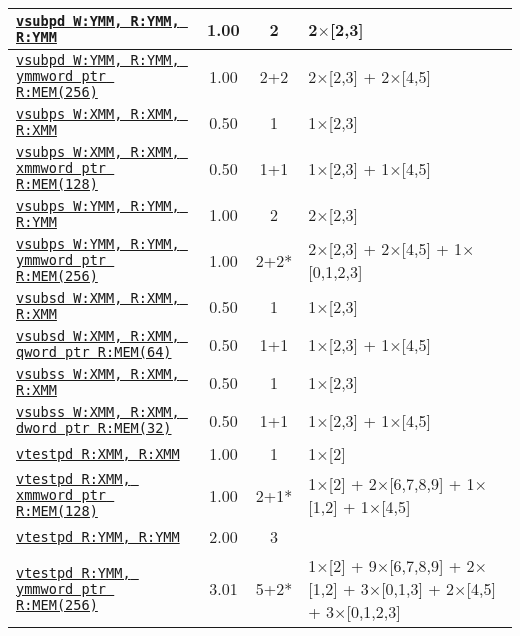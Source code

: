 \documentclass[a4paper,english,fontsize=9]{scrartcl}
\begin{document}
\begin{longtable}{p{}ccL{.25\textwidth}}
  \midrule
  \texttt{\href{https://felixcloutier.com/x86/SUBPD.html}{vsubpd W:YMM, R:YMM, R:YMM}} & 1.00 & 2 & 2\(\times\)[2,3] \\
  \midrule
  \texttt{\href{https://felixcloutier.com/x86/SUBPD.html}{vsubpd W:YMM, R:YMM, ymmword ptr R:MEM(256)}} & 1.00 & 2+2 & 2\(\times\)[2,3] + 2\(\times\)[4,5] \\
  \midrule
  \texttt{\href{https://felixcloutier.com/x86/SUBPS.html}{vsubps W:XMM, R:XMM, R:XMM}} & 0.50 & 1 & 1\(\times\)[2,3] \\
  \midrule
  \texttt{\href{https://felixcloutier.com/x86/SUBPS.html}{vsubps W:XMM, R:XMM, xmmword ptr R:MEM(128)}} & 0.50 & 1+1 & 1\(\times\)[2,3] + 1\(\times\)[4,5] \\
  \midrule
  \texttt{\href{https://felixcloutier.com/x86/SUBPS.html}{vsubps W:YMM, R:YMM, R:YMM}} & 1.00 & 2 & 2\(\times\)[2,3] \\
  \midrule
  \texttt{\href{https://felixcloutier.com/x86/SUBPS.html}{vsubps W:YMM, R:YMM, ymmword ptr R:MEM(256)}} & 1.00 & 2+2* & 2\(\times\)[2,3] + 2\(\times\)[4,5] + 1\(\times\)[0,1,2,3] \\
  \midrule
  \texttt{\href{https://felixcloutier.com/x86/SUBSD.html}{vsubsd W:XMM, R:XMM, R:XMM}} & 0.50 & 1 & 1\(\times\)[2,3] \\
  \midrule
  \texttt{\href{https://felixcloutier.com/x86/SUBSD.html}{vsubsd W:XMM, R:XMM, qword ptr R:MEM(64)}} & 0.50 & 1+1 & 1\(\times\)[2,3] + 1\(\times\)[4,5] \\
  \midrule
  \texttt{\href{https://felixcloutier.com/x86/SUBSS.html}{vsubss W:XMM, R:XMM, R:XMM}} & 0.50 & 1 & 1\(\times\)[2,3] \\
  \midrule
  \texttt{\href{https://felixcloutier.com/x86/SUBSS.html}{vsubss W:XMM, R:XMM, dword ptr R:MEM(32)}} & 0.50 & 1+1 & 1\(\times\)[2,3] + 1\(\times\)[4,5] \\
  \midrule
  \texttt{\href{https://felixcloutier.com/x86/VTESTPD:VTESTPS.html}{vtestpd R:XMM, R:XMM}} & 1.00 & 1 & 1\(\times\)[2] \\
  \midrule
  \texttt{\href{https://felixcloutier.com/x86/VTESTPD:VTESTPS.html}{vtestpd R:XMM, xmmword ptr R:MEM(128)}} & 1.00 & 2+1* & 1\(\times\)[2] + 2\(\times\)[6,7,8,9] + 1\(\times\)[1,2] + 1\(\times\)[4,5] \\
  \midrule
  \texttt{\href{https://felixcloutier.com/x86/VTESTPD:VTESTPS.html}{vtestpd R:YMM, R:YMM}} & 2.00 & 3 &  \\
  \midrule
  \texttt{\href{https://felixcloutier.com/x86/VTESTPD:VTESTPS.html}{vtestpd R:YMM, ymmword ptr R:MEM(256)}} & 3.01 & 5+2* & 1\(\times\)[2] + 9\(\times\)[6,7,8,9] + 2\(\times\)[1,2] + 3\(\times\)[0,1,3] + 2\(\times\)[4,5] + 3\(\times\)[0,1,2,3] \\

\end{longtable}
\end{document}
